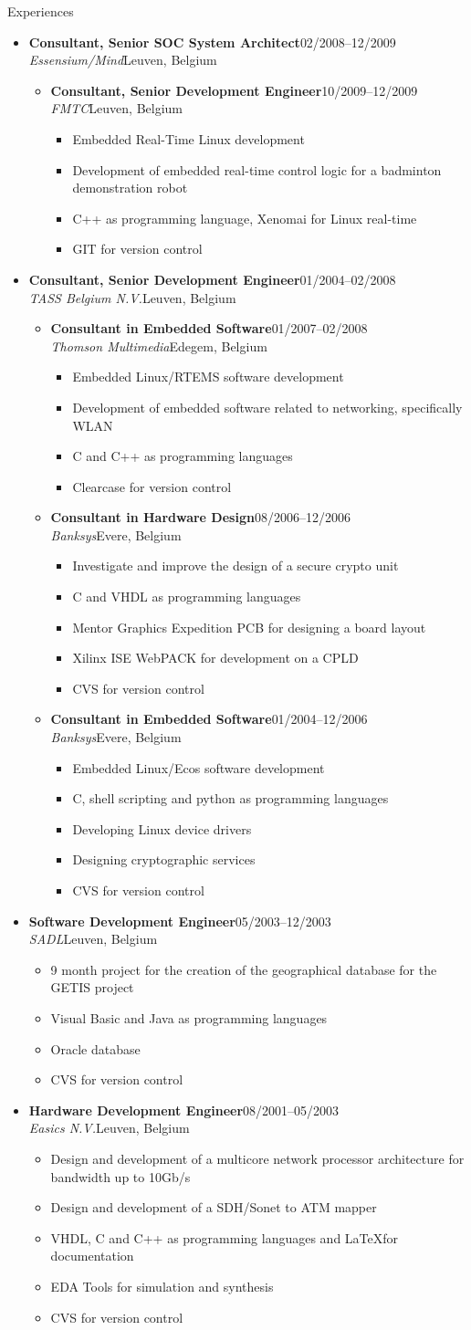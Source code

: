 \documentclass[12pt,oneside]{article}
\newenvironment{ressection}[1]{
	\vspace{5pt}
	{\selectfont\Large#1}
	\begin{itemize}
	\vspace{5pt}
}{
	\end{itemize}
}
\newcommand{\ressubitem}[1]{
	\vspace{-4pt}
	\item \begin{flushleft} #1 \end{flushleft}
}
\newcommand{\resbigitem}[4]{
	\vspace{-5pt}
	\item
	\textbf{#1}\hfill#4 \\
	\textit{#2}\hfill#3
}
\newenvironment{ressubsec}[4]{
	\resbigitem{#1}{#2}{#3}{#4}
	\vspace{-2pt}
	\begin{itemize}
}{
	\end{itemize}
}
\newenvironment{ressubsubsec}[4]{
	\vspace{5pt}
	\resbigitem{#1}{#2}{#3}{#4}
	\begin{itemize}
}{
	\end{itemize}
}
\newcommand{\ressubsubitem}[1]{
	\vspace{-1pt}
	\item \begin{flushleft} #1 \end{flushleft}
}
\begin{document}
\begin{ressection}{Experiences}
\begin{ressubsec}{Consultant, Senior SOC System Architect}{Essensium/Mind}{Leuven, Belgium}{02/2008--12/2009}
\begin{ressubsubsec}{Consultant, Senior Development Engineer}{FMTC}{Leuven, Belgium}{10/2009--12/2009}
			\ressubsubitem{Embedded Real-Time Linux development}
			\ressubsubitem{Development of embedded real-time control logic for a badminton demonstration robot}
			\ressubsubitem{C++ as programming language, Xenomai for Linux real-time}
			\ressubsubitem{GIT for version control}
		\end{ressubsubsec}
	\end{ressubsec}
	\begin{ressubsec}{Consultant, Senior Development Engineer}{TASS Belgium N.V.}{Leuven, Belgium}{01/2004--02/2008}
		\begin{ressubsubsec}{Consultant in Embedded Software}{Thomson Multimedia}{Edegem, Belgium}{01/2007--02/2008}
			\ressubsubitem{Embedded Linux/RTEMS software development}
			\ressubsubitem{Development of embedded software related to networking, specifically WLAN}
			\ressubsubitem{C and C++ as programming languages}
			\ressubsubitem{Clearcase for version control}
		\end{ressubsubsec}
		\begin{ressubsubsec}{Consultant in Hardware Design}{Banksys}{Evere, Belgium}{08/2006--12/2006}
			\ressubsubitem{Investigate and improve the design of a secure crypto unit}
			\ressubsubitem{C and VHDL as programming languages}
			\ressubsubitem{Mentor Graphics Expedition PCB for designing a board layout}
			\ressubsubitem{Xilinx ISE WebPACK for development on a CPLD}
			\ressubsubitem{CVS for version control}
		\end{ressubsubsec}
		\begin{ressubsubsec}{Consultant in Embedded Software}{Banksys}{Evere, Belgium}{01/2004--12/2006}
			\ressubsubitem{Embedded Linux/Ecos software development}
			\ressubsubitem{C, shell scripting and python as programming languages}
			\ressubsubitem{Developing Linux device drivers}
			\ressubsubitem{Designing cryptographic services}
			\ressubsubitem{CVS for version control}
		\end{ressubsubsec}
	\end{ressubsec}
	\begin{ressubsec}{Software Development Engineer}{SADL}{Leuven, Belgium}{05/2003--12/2003}
		\ressubitem{9 month project for the creation of the geographical database for the GETIS project}
		\ressubitem{Visual Basic and Java as programming languages}
		\ressubitem{Oracle database}
		\ressubitem{CVS for version control}
	\end{ressubsec}
	\begin{ressubsec}{Hardware Development Engineer}{Easics N.V.}{Leuven, Belgium}{08/2001--05/2003}
		\ressubitem{Design and development of a multicore network processor architecture for bandwidth up to 10Gb/s}
		\ressubitem{Design and development of a SDH/Sonet to ATM mapper}
		\ressubitem{VHDL, C and C++ as programming languages and \LaTeX for documentation}
		\ressubitem{EDA Tools for simulation and synthesis}
		\ressubitem{CVS for version control}
	\end{ressubsec}
\end{ressection}
\end{document}
